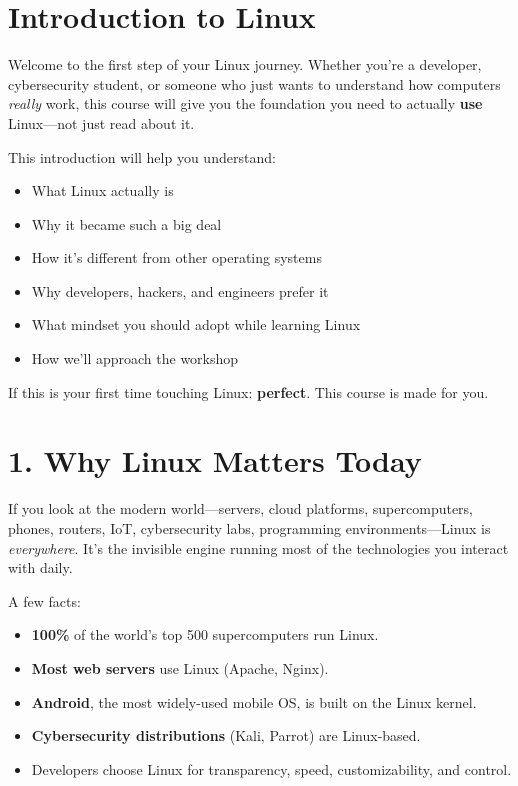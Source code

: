 \documentclass[12pt]{article}
\begin{document}
\section*{Introduction to Linux}

\begin{infobox}
Welcome to the first step of your Linux journey. Whether you're a developer, cybersecurity student, or someone who just wants to understand how computers \textit{really} work, this course will give you the foundation you need to actually \textbf{use} Linux—not just read about it.
\end{infobox}

This introduction will help you understand:

\begin{itemize}
    \item What Linux actually is
    \item Why it became such a big deal
    \item How it's different from other operating systems
    \item Why developers, hackers, and engineers prefer it
    \item What mindset you should adopt while learning Linux
    \item How we'll approach the workshop
\end{itemize}

\begin{warningbox}
If this is your first time touching Linux: \textbf{perfect}. This course is made for you.
\end{warningbox}

\section*{1. Why Linux Matters Today}

If you look at the modern world—servers, cloud platforms, supercomputers, phones, routers, IoT, cybersecurity labs, programming environments—Linux is \textit{everywhere}. It's the invisible engine running most of the technologies you interact with daily.

A few facts:

\begin{itemize}
    \item \textbf{100\%} of the world's top 500 supercomputers run Linux.
    \item \textbf{Most web servers} use Linux (Apache, Nginx).
    \item \textbf{Android}, the most widely-used mobile OS, is built on the Linux kernel.
    \item \textbf{Cybersecurity distributions} (Kali, Parrot) are Linux-based.
    \item Developers choose Linux for transparency, speed, customizability, and control.
\end{itemize}
\end{document}
